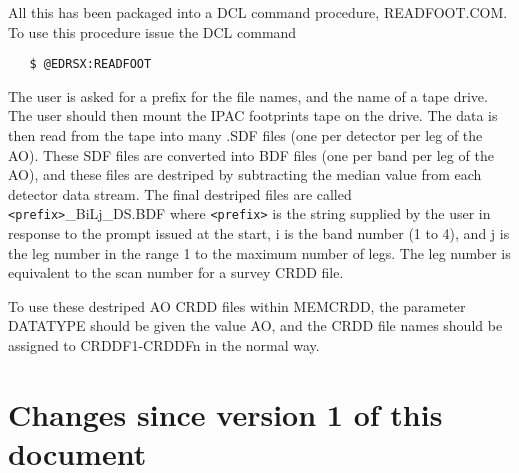 All this has been packaged into a DCL command procedure, READFOOT.COM. To
use this procedure issue the DCL command

\begin{verbatim}
   $ @EDRSX:READFOOT
\end{verbatim}

The user is asked for a prefix for the file names, and the name of a tape
drive. The user should then mount the IPAC footprints tape on the drive. The
data is then read from the tape into many .SDF files (one per detector per leg
of the AO). These SDF files are converted into BDF files (one per band per leg
of the AO), and these files are destriped by subtracting the median value from
each detector data stream. The final destriped files are called
\verb+<prefix>+\_BiLj\_DS.BDF  where \verb+<prefix>+ is the string supplied by
the user in response to the prompt issued at the start, i is the band number (1
to 4), and j is the leg number in the range 1 to the maximum number of legs.
The leg number is equivalent to the scan number for a survey CRDD file.

To use these destriped AO CRDD files within MEMCRDD, the parameter DATATYPE
should be given the value AO, and the CRDD file names should be assigned
to CRDDF1-CRDDFn in the normal way.

\section{Changes since version 1 of this document}


